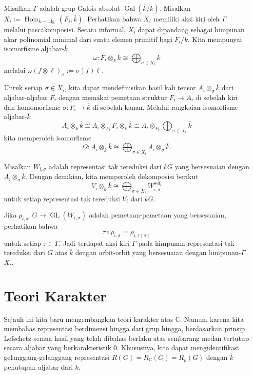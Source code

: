 \documentclass[12pt]{article}
\theoremstyle{plain}
\theoremstyle{definition}
\theoremstyle{remark}
\numberwithin{equation}{section}
\begin{document}
Misalkan $\Gamma$ adalah grup Galois absolut
$\operatorname{Gal}(\overline{k}/k)$.
Misalkan $X_i :=
\operatorname{Hom}_{k-\operatorname{alg}}(F_i,\overline{k})$.
Perhatikan bahwa $X_i$ memiliki aksi kiri oleh $\Gamma$ melalui
pascakomposisi.
Secara informal, $X_i$ dapat dipandang sebagai himpunan akar polinomial
minimal dari suatu elemen primitif bagi $F_i/k$.
Kita mempunyai isomorfisme aljabar-$\overline{k}$
\[
\omega : F_i \otimes_k \overline{k} \cong
\bigoplus_{\sigma \in X_i} \overline{k}
\]
melalui $\omega(f \otimes \ell)_{\sigma} := \sigma(f)\ell$.

Untuk setiap $\sigma \in X_i$, kita dapat mendefinisikan hasil kali tensor
$A_i \otimes_\sigma \overline{k}$ dari aljabar-aljabar $F_i$
dengan memakai pemetaan struktur $F_i \to A_i$ di sebelah kiri dan
homomorfisme $\sigma : F_i \to \overline{k}$ di sebelah kanan.
Melalui rangkaian isomorfisme aljabar-$\overline{k}$
\[
A_i \otimes_k \overline{k} \cong 
A_i \otimes_{F_i} F_i \otimes_k \overline{k}
\cong A_i \otimes_{F_i} \bigoplus_{\sigma \in X_i} \overline{k}
\]
kita memperoleh isomorfisme
\[
\Omega : A_i \otimes_k \overline{k} \cong
\bigoplus_{\sigma \in X_i} A_i \otimes_\sigma \overline{k} .
\]

Misalkan $W_{i,\sigma}$ adalah representasi tak tereduksi
dari $\overline{k}G$ yang bersesuaian dengan $A_i \otimes_\sigma \overline{k}$.
Dengan demikian, kita memperoleh dekomposisi berikut
\[
V_i \otimes_k \overline{k} \cong
\bigoplus_{\sigma \in X_i} W_{i,\sigma}^{\oplus d_i}
\]
untuk setiap representasi tak tereduksi $V_i$ dari $kG$.

Jika $\rho_{i,\sigma} : G \to \operatorname{GL}(W_{i,\sigma})$ adalah
pemetaan-pemetaan yang bersesuaian, perhatikan bahwa
\[
\tau \circ \rho_{i,\sigma} = \rho_{i,\tau(\sigma)}
\]
untuk setiap $\tau \in \Gamma$.
Jadi terdapat aksi kiri $\Gamma$ pada himpunan representasi tak tereduksi
dari $G$ atas $\overline{k}$
dengan orbit-orbit yang bersesuaian dengan himpunan-$\Gamma$ $X_i$.

\section{Teori Karakter}

Sejauh ini kita baru mengembangkan teori karakter atas $\mathbb{C}$.
Namun, karena kita membahas representasi berdimensi hingga dari
grup hingga, berdasarkan prinsip Lefschetz
semua hasil yang telah dibahas berlaku atas sembarang medan tertutup secara aljabar
yang berkarakteristik $0$.
Khususnya, kita dapat mengidentifikasi gelanggang-gelanggang representasi
$R(G)=R_{\mathbb{C}}(G)=R_{\overline{k}}(G)$
dengan $\overline{k}$ penutupan aljabar dari $k$.
\end{document}
